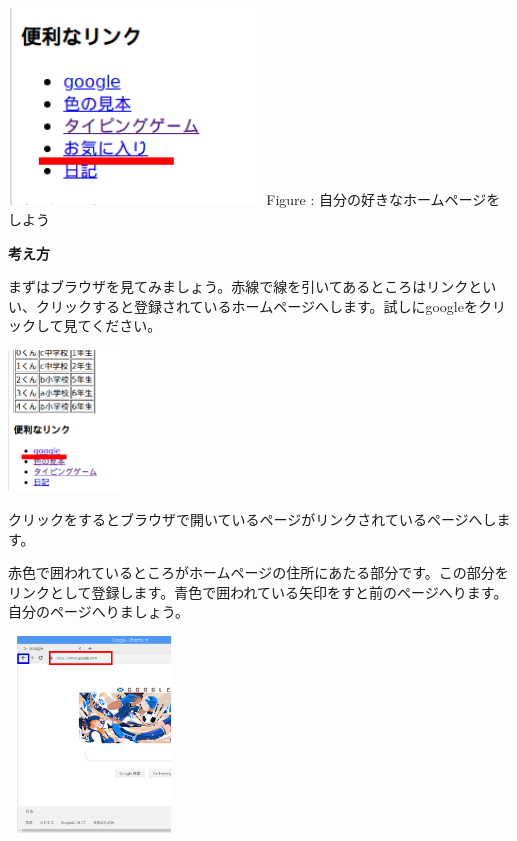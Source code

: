 \documentclass[a4paper,12pt]{jarticle}
\begin{document}
\centering
\begin{minipage}{7.593cm}
  {\upshape
    \includegraphics[width=6.71cm,height=5.221cm]{textbook-img193.png}
    \newline
    Figure :
    自分の好きなホームページをしよう}
\end{minipage}



\bigskip

\flushleft

\textbf{考え方}



まずはブラウザを見てみましょう。赤線で線を引いてあるところはリンクといい、クリックすると登録されているホームページへします。試しにgoogleをクリックして見てください。


\bigskip

\centering
\includegraphics[width=3.029cm,height=3.743cm]{textbook-img194.png}


\flushleft

\bigskip

クリックをするとブラウザで開いているページがリンクされているページへします。

赤色で囲われているところがホームページの住所にあたる部分です。この部分をリンクとして登録します。青色で囲われている矢印をすと前のページへります。自分のページへりましょう。



\bigskip

\centering
\includegraphics[width=4.547cm,height=5.216cm]{textbook-img195.png}
\end{document}
